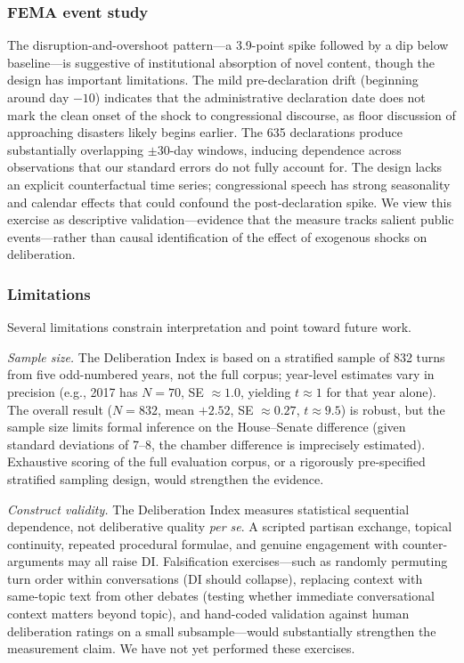 \documentclass[12pt]{article}
\begin{document}
\subsubsection*{FEMA event study} The disruption-and-overshoot pattern---a 3.9-point spike followed by a dip below baseline---is suggestive of institutional absorption of novel content, though the design has important limitations. The mild pre-declaration drift (beginning around day $-10$) indicates that the administrative declaration date does not mark the clean onset of the shock to congressional discourse, as floor discussion of approaching disasters likely begins earlier. The 635 declarations produce substantially overlapping $\pm30$-day windows, inducing dependence across observations that our standard errors do not fully account for. The design lacks an explicit counterfactual time series; congressional speech has strong seasonality and calendar effects that could confound the post-declaration spike. We view this exercise as descriptive validation---evidence that the measure tracks salient public events---rather than causal identification of the effect of exogenous shocks on deliberation.

\subsubsection*{Limitations} Several limitations constrain interpretation and point toward future work.

\textit{Sample size.} The Deliberation Index is based on a stratified sample of 832 turns from five odd-numbered years, not the full corpus; year-level estimates vary in precision (e.g., 2017 has $N = 70$, SE $\approx 1.0$, yielding $t \approx 1$ for that year alone). The overall result ($N = 832$, mean $+2.52$, SE $\approx 0.27$, $t \approx 9.5$) is robust, but the sample size limits formal inference on the House--Senate difference (given standard deviations of 7--8, the chamber difference is imprecisely estimated). Exhaustive scoring of the full evaluation corpus, or a rigorously pre-specified stratified sampling design, would strengthen the evidence.

\textit{Construct validity.} The Deliberation Index measures statistical sequential dependence, not deliberative quality \textit{per se}. A scripted partisan exchange, topical continuity, repeated procedural formulae, and genuine engagement with counter-arguments may all raise DI. Falsification exercises---such as randomly permuting turn order within conversations (DI should collapse), replacing context with same-topic text from other debates (testing whether immediate conversational context matters beyond topic), and hand-coded validation against human deliberation ratings on a small subsample---would substantially strengthen the measurement claim. We have not yet performed these exercises.
\end{document}
